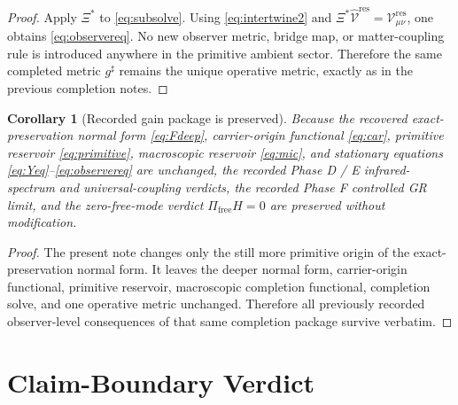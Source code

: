 \documentclass[11pt]{article}
\newcommand{\ObserverMap}{\Xi}
\newcommand{\CompletedMetric}{g^{\sharp}}
\newcommand{\ResidualCore}{\mathcal V_{\mu\nu}^{\mathrm{res}}}
\newcommand{\ResidualLift}{\widehat{\mathcal V}^{\mathrm{res}}}
\newtheorem{corollary}{Corollary}
\begin{document}
\begin{proof}
Apply \(\ObserverMap^*\) to \eqref{eq:subsolve}. Using \eqref{eq:intertwine2} and \(\ObserverMap^*\ResidualLift=\ResidualCore\), one obtains \eqref{eq:observereq}. No new observer metric, bridge map, or matter-coupling rule is introduced anywhere in the primitive ambient sector. Therefore the same completed metric \(\CompletedMetric\) remains the unique operative metric, exactly as in the previous completion notes.
\end{proof}

\begin{corollary}[Recorded gain package is preserved]
\label{cor:gains}
Because the recovered exact-preservation normal form \eqref{eq:Fdeep}, carrier-origin functional \eqref{eq:car}, primitive reservoir \eqref{eq:primitive}, macroscopic reservoir \eqref{eq:mic}, and stationary equations \eqref{eq:Yeq}--\eqref{eq:observereq} are unchanged, the recorded Phase D / E infrared-spectrum and universal-coupling verdicts, the recorded Phase F controlled GR limit, and the zero-free-mode verdict \(\Pi_{\mathrm{free}}H=0\) are preserved without modification.
\end{corollary}

\begin{proof}
The present note changes only the still more primitive origin of the exact-preservation normal form. It leaves the deeper normal form, carrier-origin functional, primitive reservoir, macroscopic completion functional, completion solve, and one operative metric unchanged. Therefore all previously recorded observer-level consequences of that same completion package survive verbatim.
\end{proof}

\section{Claim-Boundary Verdict}
\end{document}
